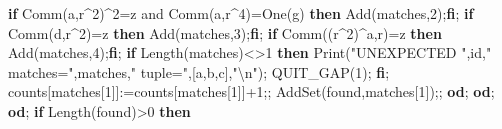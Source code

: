 \documentclass[
  10pt,
  letterpaper,
]{article}
\newenvironment{Shaded}{}{}
\newcommand{\BuiltInTok}[1]{\textcolor[rgb]{0.00,0.50,0.00}{#1}}
\newcommand{\ConstantTok}[1]{\textcolor[rgb]{0.53,0.00,0.00}{#1}}
\newcommand{\ControlFlowTok}[1]{\textcolor[rgb]{0.00,0.44,0.13}{\textbf{#1}}}
\newcommand{\FloatTok}[1]{\textcolor[rgb]{0.25,0.63,0.44}{#1}}
\newcommand{\NormalTok}[1]{#1}
\newcommand{\OperatorTok}[1]{\textcolor[rgb]{0.40,0.40,0.40}{#1}}
\newcommand{\StringTok}[1]{\textcolor[rgb]{0.25,0.44,0.63}{#1}}
\newcommand{\VariableTok}[1]{\textcolor[rgb]{0.10,0.09,0.49}{#1}}
\begin{document}
\begin{Shaded}
\begin{Highlighting}[]
    \ControlFlowTok{if} \BuiltInTok{Comm}\NormalTok{(}\VariableTok{a}\OperatorTok{,}\VariableTok{r}\OperatorTok{\^{}}\FloatTok{2}\NormalTok{)}\OperatorTok{\^{}}\FloatTok{2}\OperatorTok{=}\VariableTok{z} \ConstantTok{and} \BuiltInTok{Comm}\NormalTok{(}\VariableTok{a}\OperatorTok{,}\VariableTok{r}\OperatorTok{\^{}}\FloatTok{4}\NormalTok{)}\OperatorTok{=}\BuiltInTok{One}\NormalTok{(}\VariableTok{g}\NormalTok{) }\ControlFlowTok{then} \BuiltInTok{Add}\NormalTok{(}\VariableTok{matches}\OperatorTok{,}\FloatTok{2}\NormalTok{)}\OperatorTok{;}\ControlFlowTok{fi}\OperatorTok{;}
    \ControlFlowTok{if} \BuiltInTok{Comm}\NormalTok{(}\VariableTok{d}\OperatorTok{,}\VariableTok{r}\OperatorTok{\^{}}\FloatTok{2}\NormalTok{)}\OperatorTok{=}\VariableTok{z} \ControlFlowTok{then} \BuiltInTok{Add}\NormalTok{(}\VariableTok{matches}\OperatorTok{,}\FloatTok{3}\NormalTok{)}\OperatorTok{;}\ControlFlowTok{fi}\OperatorTok{;}
    \ControlFlowTok{if} \BuiltInTok{Comm}\NormalTok{((}\VariableTok{r}\OperatorTok{\^{}}\FloatTok{2}\NormalTok{)}\OperatorTok{\^{}}\VariableTok{a}\OperatorTok{,}\VariableTok{r}\NormalTok{)}\OperatorTok{=}\VariableTok{z} \ControlFlowTok{then} \BuiltInTok{Add}\NormalTok{(}\VariableTok{matches}\OperatorTok{,}\FloatTok{4}\NormalTok{)}\OperatorTok{;}\ControlFlowTok{fi}\OperatorTok{;}
    \ControlFlowTok{if} \BuiltInTok{Length}\NormalTok{(}\VariableTok{matches}\NormalTok{)}\OperatorTok{\textless{}\textgreater{}}\FloatTok{1} \ControlFlowTok{then}
     \BuiltInTok{Print}\NormalTok{(}\StringTok{"UNEXPECTED "}\OperatorTok{,}\VariableTok{id}\OperatorTok{,}\StringTok{" matches="}\OperatorTok{,}\VariableTok{matches}\OperatorTok{,}\StringTok{" tuple="}\OperatorTok{,}\NormalTok{[}\VariableTok{a}\OperatorTok{,}\VariableTok{b}\OperatorTok{,}\VariableTok{c}\NormalTok{]}\OperatorTok{,}\StringTok{"\textbackslash{}n"}\NormalTok{)}\OperatorTok{;}
     \VariableTok{QUIT\_GAP}\NormalTok{(}\FloatTok{1}\NormalTok{)}\OperatorTok{;}
    \ControlFlowTok{fi}\OperatorTok{;}
    \VariableTok{counts}\NormalTok{[}\VariableTok{matches}\NormalTok{[}\FloatTok{1}\NormalTok{]]}\OperatorTok{:=}\VariableTok{counts}\NormalTok{[}\VariableTok{matches}\NormalTok{[}\FloatTok{1}\NormalTok{]]}\OperatorTok{+}\FloatTok{1}\OperatorTok{;;}
    \BuiltInTok{AddSet}\NormalTok{(}\VariableTok{found}\OperatorTok{,}\VariableTok{matches}\NormalTok{[}\FloatTok{1}\NormalTok{])}\OperatorTok{;;}
   \ControlFlowTok{od}\OperatorTok{;}
  \ControlFlowTok{od}\OperatorTok{;}
 \ControlFlowTok{od}\OperatorTok{;}
 \ControlFlowTok{if} \BuiltInTok{Length}\NormalTok{(}\VariableTok{found}\NormalTok{)}\OperatorTok{\textgreater{}}\FloatTok{0} \ControlFlowTok{then}

\end{Highlighting}
\end{Shaded}
\end{document}
